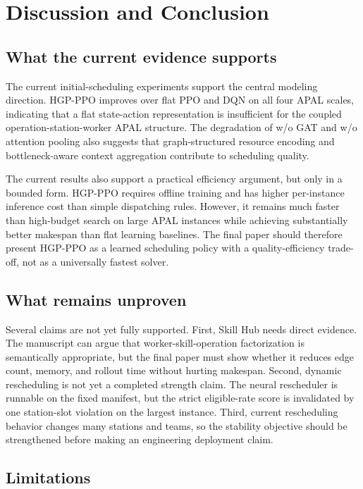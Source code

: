 \section{Discussion and Conclusion}
\label{sec:discussion}

\subsection{What the current evidence supports}

The current initial-scheduling experiments support the central modeling direction. HGP-PPO improves over flat PPO and DQN on all four APAL scales, indicating that a flat state-action representation is insufficient for the coupled operation-station-worker APAL structure. The degradation of w/o GAT and w/o attention pooling also suggests that graph-structured resource encoding and bottleneck-aware context aggregation contribute to scheduling quality.

The current results also support a practical efficiency argument, but only in a bounded form. HGP-PPO requires offline training and has higher per-instance inference cost than simple dispatching rules. However, it remains much faster than high-budget search on large APAL instances while achieving substantially better makespan than flat learning baselines. The final paper should therefore present HGP-PPO as a learned scheduling policy with a quality-efficiency trade-off, not as a universally fastest solver.

\subsection{What remains unproven}

Several claims are not yet fully supported. First, Skill Hub needs direct evidence. The manuscript can argue that worker-skill-operation factorization is semantically appropriate, but the final paper must show whether it reduces edge count, memory, and rollout time without hurting makespan. Second, dynamic rescheduling is not yet a completed strength claim. The neural rescheduler is runnable on the fixed manifest, but the strict eligible-rate score is invalidated by one station-slot violation on the largest instance. Third, current rescheduling behavior changes many stations and teams, so the stability objective should be strengthened before making an engineering deployment claim.

\subsection{Limitations}

